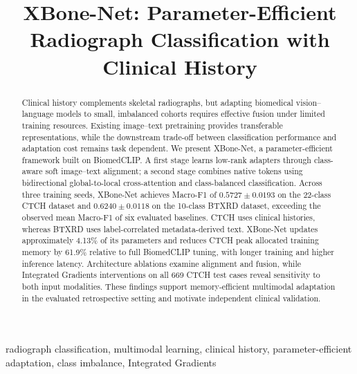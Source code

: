 \documentclass[conference,a4paper]{IEEEtran}
\begin{document}
\title{XBone-Net: Parameter-Efficient Radiograph Classification with Clinical History}
\author{
}
\maketitle

\begin{abstract}
Clinical history complements skeletal radiographs, but adapting biomedical vision--language models to small, imbalanced cohorts requires effective fusion under limited training resources. Existing image--text pretraining provides transferable representations, while the downstream trade-off between classification performance and adaptation cost remains task dependent. We present XBone-Net, a parameter-efficient framework built on BiomedCLIP. A first stage learns low-rank adapters through class-aware soft image--text alignment; a second stage combines native tokens using bidirectional global-to-local cross-attention and class-balanced classification. Across three training seeds, XBone-Net achieves Macro-F1 of $0.5727\pm0.0193$ on the 22-class CTCH dataset and $0.6240\pm0.0118$ on the 10-class BTXRD dataset, exceeding the observed mean Macro-F1 of six evaluated baselines. CTCH uses clinical histories, whereas BTXRD uses label-correlated metadata-derived text. XBone-Net updates approximately 4.13\% of its parameters and reduces CTCH peak allocated training memory by 61.9\% relative to full BiomedCLIP tuning, with longer training and higher inference latency. Architecture ablations examine alignment and fusion, while Integrated Gradients interventions on all 669 CTCH test cases reveal sensitivity to both input modalities. These findings support memory-efficient multimodal adaptation in the evaluated retrospective setting and motivate independent clinical validation.
\end{abstract}
\begin{IEEEkeywords}
radiograph classification, multimodal learning, clinical history, parameter-efficient adaptation, class imbalance, Integrated Gradients
\end{IEEEkeywords}
\end{document}
